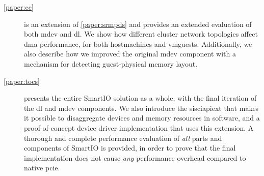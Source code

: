 \begin{description}
    \item[\cref{paper:cc}]
        is an extension of \cref{paper:srmpds} and provides an extended evaluation of both \gls{mdev} and \gls{dl}.
        We show how different cluster network topologies affect \gls{dma} performance, for both \glspl{hostmachine} and \glspl{vmguest}.
        Additionally, we also describe how we improved the original \gls{mdev} component with a mechanism for detecting \gls{guest}-physical memory layout.

    \item[\cref{paper:tocs}]
        presents the entire SmartIO solution as a whole, with the final iteration of the \gls{dl} and \gls{mdev} components.
        We also introduce the \gls{sisciapiext} that makes it possible to \gls{disaggregate} devices and memory resources in software, and a proof-of-concept device driver implementation that uses this extension.
        A thorough and complete performance evaluation of \emph{all} parts and components of SmartIO is provided, in order to prove that the final implementation does not cause \emph{any} performance overhead compared to native \gls{pcie}.
\end{description}

